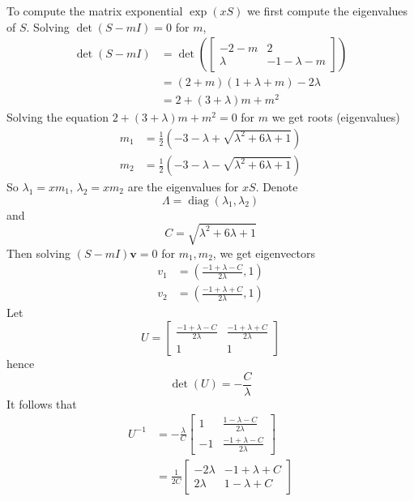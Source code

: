 To compute the matrix exponential $\exp(x S)$ we first compute the eigenvalues of $S$.
Solving $\det(S - m I) = 0$ for $m$,
\begin{align*}
    \det(S - m I) &= \det\left(\begin{bmatrix}
        -2 - m & 2\\
        \lambda & - 1 - \lambda - m
    \end{bmatrix} \right)\\
    &= (2 + m) (1 + \lambda + m) - 2 \lambda\\
    &= 2 + (3 + \lambda) m + m^2
\end{align*}
Solving the equation $2 + (3 + \lambda) m + m^2 = 0$ for $m$ we get roots (eigenvalues)
\begin{align*}
    m_1 &= \frac{1}{2}(-3 - \lambda + \sqrt{\lambda^2 + 6 \lambda + 1})\\
    m_2 &= \frac{1}{2}(-3 - \lambda - \sqrt{\lambda^2 + 6 \lambda + 1})
\end{align*}
So $\lambda_1 = x m_1$, $\lambda_2 = x m_2$ are the eigenvalues for $x S$.
Denote
$$
\Lambda = \operatorname{diag}(\lambda_1, \lambda_2)
$$
and
$$
C = \sqrt{\lambda^2 + 6 \lambda + 1}
$$
Then solving $(S - m I) \mathbf{v} = 0$ for $m_1, m_2$, we get eigenvectors
\begin{align*}
    v_1 &= \left( \frac{-1 + \lambda - C}{2\lambda}, 1 \right)\\
    v_2 &= \left( \frac{-1 + \lambda + C}{2\lambda}, 1 \right)
\end{align*}
Let
$$
U = \begin{bmatrix}
    \frac{-1 + \lambda - C}{2\lambda} & \frac{-1 + \lambda + C}{2\lambda}\\
    1 & 1
\end{bmatrix}
$$
hence
$$
\det(U) = - \frac{C}{\lambda}
$$
It follows that
\begin{align*}
    U^{-1} &= - \frac{\lambda}{C} \begin{bmatrix}
    1 & \frac{1 - \lambda - C}{2\lambda}\\
    -1 & \frac{-1 + \lambda - C}{2\lambda}
    \end{bmatrix}\\
    &= \frac{1}{2C} \begin{bmatrix}
    -2\lambda & -1 + \lambda + C\\
    2\lambda & 1 - \lambda + C
    \end{bmatrix}
\end{align*}

